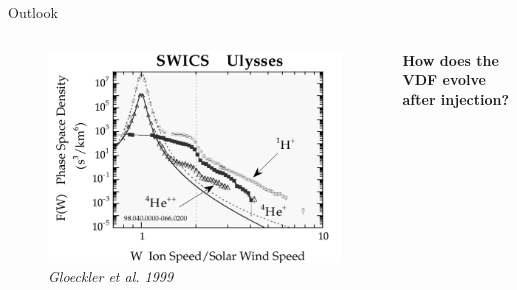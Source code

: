 \documentclass{beamer}
\begin{document}
\begin{frame}{Outlook}
\begin{columns}
\begin{figure}[h]
		\includegraphics[scale=0.22]{pictures/sw_pui_gloeckler.png}
		\begin{center}
			\caption{\tiny{\textit{Gloeckler et al. 1999}}}
		\end{center}
	\end{figure}
		\column{4cm}
\begin{center}	
		\textbf{How does the VDF evolve after injection?}
\end{center}
		\vspace{3.5cm}
\end{columns}
\end{frame}
\end{document}
